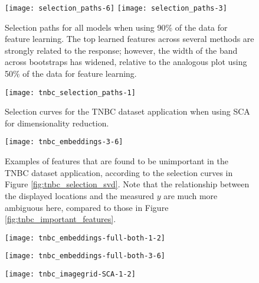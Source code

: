 \begin{figure}
  \centering
  \texttt{[image: selection\_paths-6]}
  \texttt{[image: selection\_paths-3]}
  \caption{Selection paths for all models when using 90\% of the data for
    feature learning. The top learned features across several methods are
    strongly related to the response; however, the width of the band across
    bootstraps has widened, relative to the analogous plot using 50\% of the
    data for feature learning.}
  \label{fig:selection_paths90}
\end{figure}

\begin{figure}
  \centering
  \texttt{[image: tnbc\_selection\_paths-1]}
  \caption{Selection curves for the TNBC dataset application when using SCA for
    dimensionality reduction.}
  \label{fig:tnbc_selection_paths-1}
\end{figure}

\begin{figure}
  \centering
  \texttt{[image: tnbc\_embeddings-3-6]}
  \caption{Examples of features that are found to be unimportant in the TNBC
    dataset application, according to the selection curves in Figure
    \ref{fig:tnbc_selection_svd}. Note that the relationship between the
    displayed locations and the measured $y$ are much more ambiguous here,
    compared to those in Figure \ref{fig:tnbc_important_features}.}
  \label{fig:tnbc_embeddings-3-6}
\end{figure}

\begin{figure}
\centering
  \texttt{[image: tnbc\_embeddings-full-both-1-2]}
\end{figure}

\begin{figure}
\centering
  \texttt{[image: tnbc\_embeddings-full-both-3-6]}
\end{figure}

\begin{figure}
\centering
  \texttt{[image: tnbc\_imagegrid-SCA-1-2]}
\end{figure}
